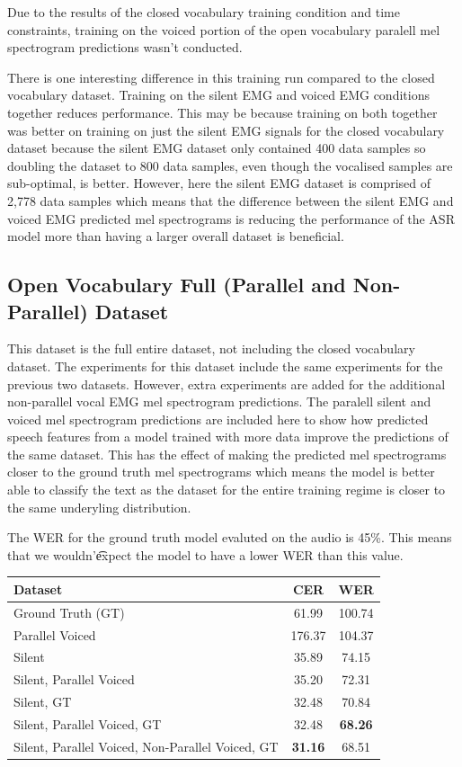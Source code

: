 Due to the results of the closed vocabulary training condition and time constraints,
training on the voiced portion of the open vocabulary paralell mel spectrogram
predictions wasn't conducted.

There is one interesting difference in this training run compared to the closed
vocabulary dataset. Training on the silent EMG and voiced EMG conditions together
reduces performance. This may be because training on both together was better
on training on just the silent EMG signals for the closed vocabulary dataset
because the silent EMG dataset only contained 400 data samples so doubling
the dataset to 800 data samples, even though the vocalised samples are sub-optimal,
is better. However, here the silent EMG dataset is comprised of 2,778 data samples
which means that the difference between the silent EMG and voiced EMG predicted
mel spectrograms is reducing the performance of the ASR model more than having a
larger overall dataset is beneficial.

\subsection{Open Vocabulary Full (Parallel and Non-Parallel) Dataset}

This dataset is the full entire dataset, not including the closed vocabulary
dataset. The experiments for this dataset include the same experiments for
the previous two datasets. However, extra experiments are added for the additional
non-parallel vocal EMG mel spectrogram predictions. The paralell silent and voiced
mel spectrogram predictions are included here to show how predicted speech features
from a model trained with more data improve the predictions of the same dataset.
This has the effect of making the predicted mel spectrograms closer to the ground
truth mel spectrograms which means the model is better able to classify the text
as the dataset for the entire training regime is closer to the same underyling distribution.

The WER for the ground truth model evaluted on the audio is 45\%. This means that we wouldn'\t
expect the model to have a lower WER than this value.

{\small\begin{center}
\begin{tabular} {  l  c  c  }
\hline
\textbf{Dataset} & \textbf{CER} & \textbf{WER} \\
\hline
Ground Truth (GT) & 61.99 & 100.74 \\
Parallel Voiced & 176.37 & 104.37 \\
Silent & 35.89 & 74.15 \\
Silent, Parallel Voiced & 35.20 & 72.31 \\
Silent, GT & 32.48 & 70.84 \\
\hline
Silent, Parallel Voiced, GT & 32.48 & \textbf{68.26} \\
Silent, Parallel Voiced, Non-Parallel Voiced, GT & \textbf{31.16} & 68.51 \\
\hline
\end{tabular}
\end{center}}

